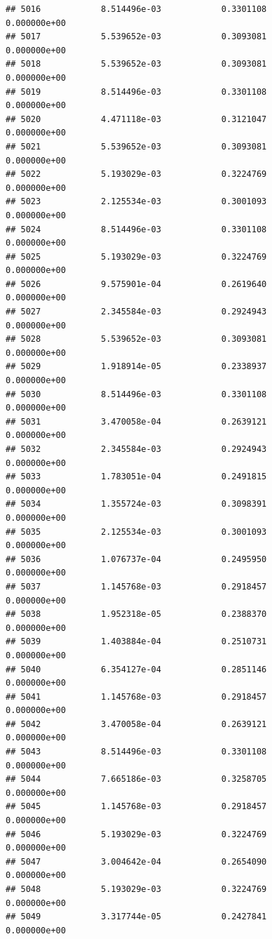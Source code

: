 \documentclass[
]{article}
\begin{document}
\begin{verbatim}
## 5016            8.514496e-03            0.3301108            0.000000e+00
## 5017            5.539652e-03            0.3093081            0.000000e+00
## 5018            5.539652e-03            0.3093081            0.000000e+00
## 5019            8.514496e-03            0.3301108            0.000000e+00
## 5020            4.471118e-03            0.3121047            0.000000e+00
## 5021            5.539652e-03            0.3093081            0.000000e+00
## 5022            5.193029e-03            0.3224769            0.000000e+00
## 5023            2.125534e-03            0.3001093            0.000000e+00
## 5024            8.514496e-03            0.3301108            0.000000e+00
## 5025            5.193029e-03            0.3224769            0.000000e+00
## 5026            9.575901e-04            0.2619640            0.000000e+00
## 5027            2.345584e-03            0.2924943            0.000000e+00
## 5028            5.539652e-03            0.3093081            0.000000e+00
## 5029            1.918914e-05            0.2338937            0.000000e+00
## 5030            8.514496e-03            0.3301108            0.000000e+00
## 5031            3.470058e-04            0.2639121            0.000000e+00
## 5032            2.345584e-03            0.2924943            0.000000e+00
## 5033            1.783051e-04            0.2491815            0.000000e+00
## 5034            1.355724e-03            0.3098391            0.000000e+00
## 5035            2.125534e-03            0.3001093            0.000000e+00
## 5036            1.076737e-04            0.2495950            0.000000e+00
## 5037            1.145768e-03            0.2918457            0.000000e+00
## 5038            1.952318e-05            0.2388370            0.000000e+00
## 5039            1.403884e-04            0.2510731            0.000000e+00
## 5040            6.354127e-04            0.2851146            0.000000e+00
## 5041            1.145768e-03            0.2918457            0.000000e+00
## 5042            3.470058e-04            0.2639121            0.000000e+00
## 5043            8.514496e-03            0.3301108            0.000000e+00
## 5044            7.665186e-03            0.3258705            0.000000e+00
## 5045            1.145768e-03            0.2918457            0.000000e+00
## 5046            5.193029e-03            0.3224769            0.000000e+00
## 5047            3.004642e-04            0.2654090            0.000000e+00
## 5048            5.193029e-03            0.3224769            0.000000e+00
## 5049            3.317744e-05            0.2427841            0.000000e+00

\end{verbatim}
\end{document}
